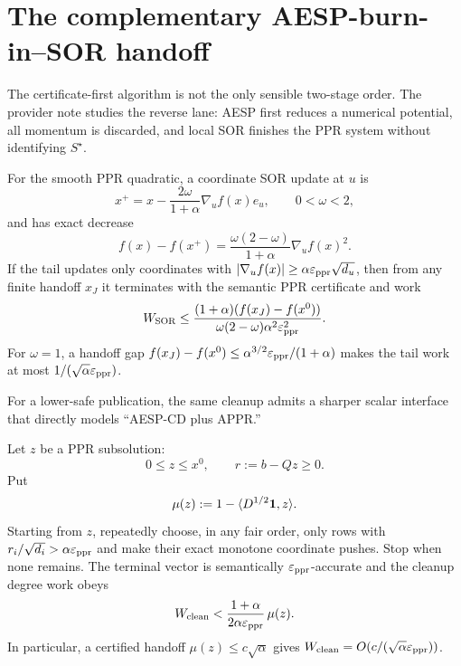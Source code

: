 \section{The complementary AESP-burn-in--SOR handoff}
\label{sec:two-stage-alternative-handoff}

The certificate-first algorithm is not the only sensible two-stage order.
The provider note  studies the reverse lane:
AESP first reduces a numerical potential, all momentum is discarded, and
local SOR finishes the PPR system without identifying $S^\star$.

For the smooth PPR quadratic, a coordinate SOR update at $u$ is
\begin{equation}
 x^+=x-\frac{2\omega}{1+\alpha}\nabla_u f(x)e_u,
 \qquad 0<\omega<2,
 \label{eq:two-stage-sor-step}
\end{equation}
and has exact decrease
\begin{equation}
 f(x)-f(x^+)
 =\frac{\omega(2-\omega)}{1+\alpha}\nabla_u f(x)^2.
 \label{eq:two-stage-sor-decrease}
\end{equation}
If the tail updates only coordinates with
$|\nabla_u f(x)|\geq\alpha\varepsilon_{\mathrm{ppr}}\sqrt{d_u}$, then from any finite handoff
$x_J$ it terminates with the semantic PPR certificate and work
\begin{equation}
 W_{\rm SOR}
 \leq
 \frac{(1+\alpha)(f(x_J)-f(x^0))}
 {\omega(2-\omega)\alpha^2\varepsilon_{\mathrm{ppr}}^2}.
 \label{eq:two-stage-sor-tail}
\end{equation}
For $\omega=1$, a handoff gap
$f(x_J)-f(x^0)\leq\alpha^{3/2}\varepsilon_{\mathrm{ppr}}/(1+\alpha)$ makes the tail work at most
$1/(\sqrt\alpha\varepsilon_{\mathrm{ppr}})$.

For a lower-safe publication, the same cleanup admits a sharper scalar
interface that directly models ``AESP-CD plus APPR.''

\begin{proposition}
\label{prop:two-stage-aesp-appr-mass-handoff}
Let $z$ be a PPR subsolution:
\begin{equation*}
 0\leq z\leq x^0,
 \qquad r:=b-Qz\geq0.
\end{equation*}
Put
\begin{equation*}
 \mu(z):=1-\langle D^{1/2}\mathbf{1},z\rangle.
\end{equation*}
Starting from $z$, repeatedly choose, in any fair order, only rows with
$r_i/\sqrt{d_i}>\alpha\varepsilon_{\mathrm{ppr}}$ and make their exact monotone coordinate
pushes.  Stop when none remains.  The terminal vector is semantically
$\varepsilon_{\mathrm{ppr}}$-accurate and the cleanup degree work obeys
\begin{equation}
 W_{\rm clean}
 <\frac{1+\alpha}{2\alpha\varepsilon_{\mathrm{ppr}}}\,\mu(z).
 \label{eq:two-stage-mass-completion-cleanup}
\end{equation}
In particular, a certified handoff
$\mu(z)\leq c\sqrt\alpha$ gives
$W_{\rm clean}=O(c/(\sqrt\alpha\varepsilon_{\mathrm{ppr}}))$.
\end{proposition}


